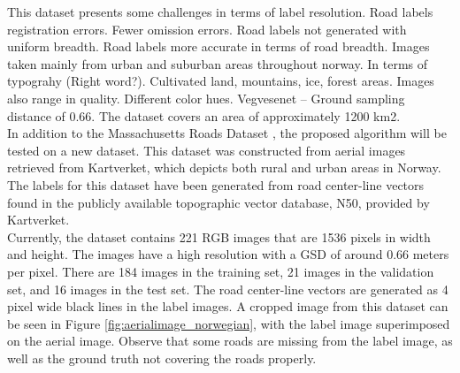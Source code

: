 This dataset presents some challenges in terms of label resolution. Road labels registration errors. Fewer omission errors.
Road labels not generated with uniform breadth. Road labels more accurate in terms of road breadth. Images taken mainly from urban and suburban areas throughout norway. In terms of typograhy (Right word?). Cultivated land, mountains, ice, forest areas. Images also range in quality. Different color hues. Vegvesenet --
Ground sampling distance of 0.66. 
The dataset covers an area of approximately 
1200 km2.\\

In addition to the Massachusetts Roads Dataset \citep{MnihThesis}, the proposed algorithm will be tested on a new dataset. This dataset was constructed from aerial images retrieved from Kartverket, which depicts both rural and urban areas in Norway. The labels for this dataset have been generated from road center-line vectors found in the publicly available topographic vector database, N50, provided by Kartverket. \\

Currently, the dataset contains 221 RGB images that are 1536 pixels in width and height. The images have a high resolution with a \ac{GSD} of around 0.66 meters per pixel. There are 184 images in the training set, 21 images in the validation set, and 16 images in the test set. The road center-line vectors are generated as 4 pixel wide black lines in the label images. A cropped image from this dataset can be seen in Figure \ref{fig:aerialimage_norwegian}, with the label image superimposed on the aerial image. Observe that some roads are missing from the label image, as well as the ground truth not covering the roads properly. \\

